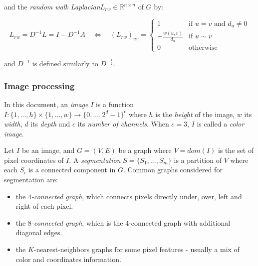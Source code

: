 and the \emph{random walk Laplacian}\footnotemark[2] $L_{rw} \in \mathbb{R}^{n \times n}$ of $G$ by:


\[
L_{rw} = D^{-1}L = I - D^{-1}A \quad \Leftrightarrow \quad (L_{rw})_{uv} = \begin{cases}
1 & \text{if }u = v \text{ and }d_u \neq 0 \\
-\frac{w(u,v)}{d_u} & \text{if }u \sim v \\
0 & \text{otherwise}
\end{cases}
\]

and $D^{-1}$ is defined similarly to $D^{-\frac{1}{2}}$.

\subsubsection{Image processing}
In this document, an \emph{image} $I$ is a function $I : \{1, ..., h\} \times \{1, ..., w\} \rightarrow \{0, ..., 2^d - 1\}^c$ where $h$ is the \emph{height} of the image, $w$ its \emph{width}, $d$ its \emph{depth} and $c$ its \emph{number of channels}. When $c = 3$, $I$ is called a \emph{color image}.

Let $I$ be an image, and $G = (V,E)$ be a graph where $V = dom(I)$ is the set of pixel coordinates of $I$. A \emph{segmentation} $S = \{S_1, ..., S_m\}$ is a partition of $V$ where each $S_i$ is a connected component in $G$. Common graphs considered for segmentation are:

\begin{itemize}
\item the \emph{$4$-connected graph}, which connects pixels directly under, over, left and right of each pixel.
\item the \emph{$8$-connected graph}, which is the $4$-connected graph with additional diagonal edges.
\item the $K$-nearest-neighbors graphs for some pixel features - usually a mix of color and coordinates information.
\end{itemize}